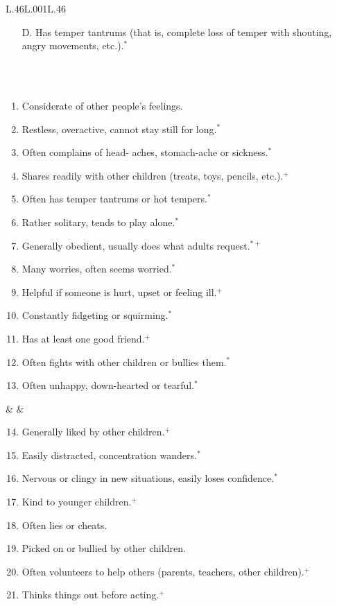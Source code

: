 \begin{table}[ht!]
\begin{tabular}{L{.46\linewidth}L{.001\linewidth}L{.46\linewidth}}
\begin{enumerate}
\item[D.] Has temper tantrums (that is, complete loss of temper with shouting, angry movements, etc.).$^*$
\end{enumerate}
\\
\midrule
{} \\[-1.8em]
\begin{enumerate}
\item Considerate of other people's feelings.
\item Restless, overactive, cannot stay still for long.$^*$
\item Often complains of head- aches, stomach-ache or sickness.$^*$
\item Shares readily with other children (treats, toys, pencils, etc.).$^+$
\item Often has temper tantrums or hot tempers.$^*$
\item Rather solitary, tends to play alone.$^*$
\item Generally obedient, usually does what adults request.$^{* +}$
\item Many worries, often seems worried.$^*$
\item Helpful if someone is hurt, upset or feeling ill.$^+$
\item Constantly fidgeting or squirming.$^*$
\item Has at least one good friend.$^+$
\item Often fights with other children or bullies them.$^*$
\item Often unhappy, down-hearted or tearful.$^*$
\end{enumerate}
& &
\begin{enumerate}\setcounter{enumi}{13}
\item Generally liked by other children.$^+$
\item Easily distracted, concentration wanders.$^*$
\item Nervous or clingy in new situations, easily loses confidence.$^*$
\item Kind to younger children.$^+$
\item Often lies or cheats.
\item Picked on or bullied by other children.
\item Often volunteers to help others (parents, teachers, other children).$^+$
\item Thinks things out before acting.$^+$

\end{enumerate}
\end{tabular}
\end{table}
